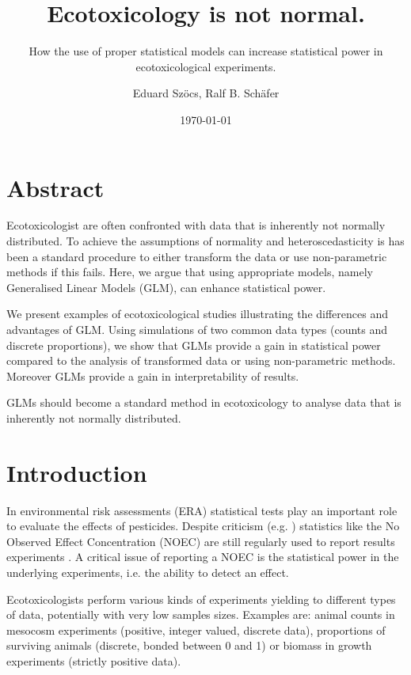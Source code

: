 \documentclass{scrartcl}
\title{Ecotoxicology is not normal.}
\subtitle{How the use of proper statistical models can increase statistical power in ecotoxicological experiments.}
\author{Eduard Szöcs, Ralf B. Schäfer}
\date{\today}
\begin{document}
\maketitle

\section*{Abstract}
Ecotoxicologist are often confronted with data that is inherently not normally distributed.
To achieve the assumptions of normality and heteroscedasticity is has been a standard procedure to either transform the data or use non-parametric methods if this fails.
Here, we argue that using appropriate models, namely Generalised Linear Models (GLM), can enhance statistical power.

We present examples of ecotoxicological studies illustrating the differences and advantages of GLM.
Using simulations of two common data types (counts and discrete proportions), we show that GLMs provide a gain in statistical power compared to the analysis of transformed data or using non-parametric methods.
Moreover GLMs provide a gain in interpretability of results.

GLMs should become a standard method in ecotoxicology to analyse data that is inherently not normally distributed.




\newpage
\section{Introduction}
In environmental risk assessments (ERA) statistical tests play an important role to evaluate the effects of pesticides. 
Despite criticism (e.g. \citet{landis_well_2011}) statistics like the No Observed Effect Concentration (NOEC) are still regularly used to report results experiments \citep{jager_bad_2012}. 
A critical issue of reporting a NOEC is the statistical power in the underlying experiments, i.e. the ability to detect an effect.

Ecotoxicologists perform various kinds of experiments yielding to different types of data, potentially with very low samples sizes. 
Examples are: animal counts in mesocosm experiments (positive, integer valued, discrete data), proportions of surviving animals (discrete, bonded between 0 and 1) or biomass in growth experiments (strictly positive data).
\end{document}
